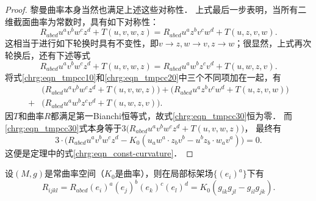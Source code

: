 \begin{proof}
    黎曼曲率本身当然也满足上述这些对称性．
    上式最后一步表明，当所有二维截面曲率为常数时，具有如下对称性：
    \begin{equation}\label{chrg:eqn_tmpcc10}
        R_{abcd}u^a v^b w^c z^d  + T(u,v,w,z) = R_{abcd}u^a z^b v^c w^d  + T(u,z,v,w).
    \end{equation}
    这相当于进行如下轮换时具有不变性，即$v\to z, w\to v, z\to w$；很显然，上式再次轮换后，还有下述等式
    \begin{equation}\label{chrg:eqn_tmpcc20}
        R_{abcd}u^a v^b w^c z^d  + T(u,v,w,z) = R_{abcd}u^a w^b z^c v^d  + T(u,w,z,v).
    \end{equation}
    将式\eqref{chrg:eqn_tmpcc10}和\eqref{chrg:eqn_tmpcc20}中三个不同项加在一起，有
    \begin{equation}\label{chrg:eqn_tmpcc30}
      \begin{aligned}
         &\bigl(R_{abcd}u^a v^b w^c z^d  + T(u,v,w,z)\bigr)+  \bigl(R_{abcd}u^a z^b v^c w^d  + T(u,z,v,w)\bigr) \\
         +& \bigl( R_{abcd}u^a w^b z^c v^d  + T(u,w,z,v)\bigr) .
      \end{aligned}
    \end{equation}
    因$T$和曲率$R$都满足第一Bianchi恒等式，故式\eqref{chrg:eqn_tmpcc30}恒为零．
    而\eqref{chrg:eqn_tmpcc30}式本身等于$3\bigl(R_{abcd}u^a v^b w^c z^d  + T(u,v,w,z)\bigr)$，
    最终有
    \begin{equation}
        3\cdot \bigl(R_{abcd} u^a v^b w^c z^d  - K_0 ( u_a w^a\cdot  z_b v^b   - u^bz_b \cdot w_a v^a  ) \bigr)= 0.
    \end{equation}
    这便是定理中的式\eqref{chrg:eqn_const-curvature}．
\end{proof}

\begin{corollary}\label{chrg:thm_const-curvature-component}
    设$(M,g)$是常曲率空间（$K_0$是曲率），则在局部标架场$\{(e_i)^a\}$下有
    \begin{equation}\label{chrg:eqn_const-curvature-component}
        R_{ijkl}= R_{abcd} (e_i)^a (e_j)^b (e_k)^c (e_l)^d
        = K_0 ( g_{ik}g_{jl}- g_{il}g_{jk}  ).
    \end{equation}
\end{corollary}

